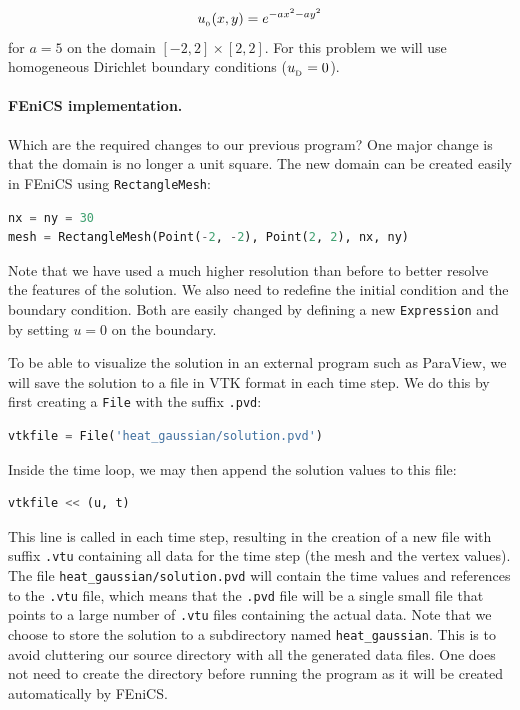\documentclass[graybox,envcountchap,sectrefs,final]{svmonodo}
\begin{document}
\[ \uI(x,y)= e^{-ax^2 - ay^2}\]
for $a = 5$ on the domain $[-2,2]\times [2,2]$. For this
problem we will use homogeneous Dirichlet boundary conditions ($\ub = 0$).

\paragraph{FEniCS implementation.}
Which are the required changes to our previous program? One major
change is that the domain is no longer a unit square. The new domain can
be created easily in FEniCS using \texttt{RectangleMesh}:

\begin{lstlisting}[language=Python,style=graycolor]
nx = ny = 30
mesh = RectangleMesh(Point(-2, -2), Point(2, 2), nx, ny)
\end{lstlisting}
Note that we have used a much higher resolution than before to better
resolve the features of the solution. We also need to redefine the
initial condition and the boundary condition. Both are easily changed by
defining a new \texttt{Expression} and by setting $u = 0$ on the boundary.

To be able to visualize the solution in an external program such as
ParaView, we will save the solution to a file in VTK format in each time
step. We do this by first creating a \texttt{File} with the suffix \texttt{.pvd}:

\begin{lstlisting}[language=Python,style=graycolor]
vtkfile = File('heat_gaussian/solution.pvd')
\end{lstlisting}
Inside the time loop, we may then append the solution values to
this file:

\begin{lstlisting}[language=Python,style=graycolor]
vtkfile << (u, t)
\end{lstlisting}
This line is called in each time step, resulting in the creation of
a new file with suffix \texttt{.vtu} containing all data for the time
step (the mesh and the vertex values). The file
\Verb!heat_gaussian/solution.pvd! will contain the time values and
references to the \texttt{.vtu} file, which means that the \texttt{.pvd} file will be a
single small file that points to a large number of \texttt{.vtu} files
containing the actual data. Note that we choose to store the solution
to a subdirectory named \Verb!heat_gaussian!. This is to avoid cluttering
our source directory with all the generated data files.
One does not need to create the directory before running the
program as it will be created automatically by FEniCS.
\end{document}
